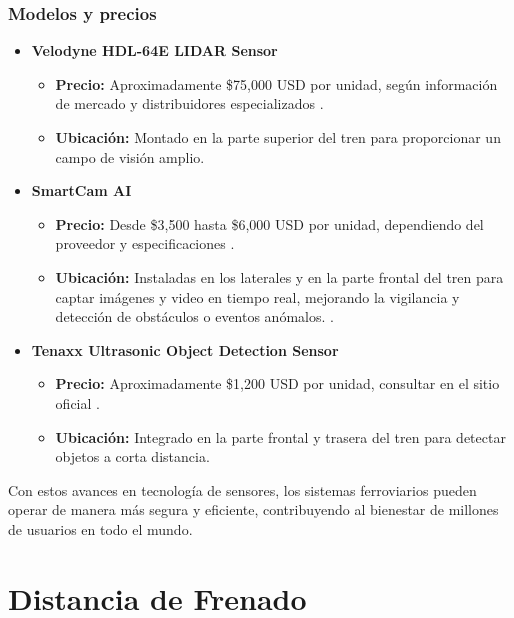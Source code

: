 \documentclass[journal]{IEEEtran}
\begin{document}
\subsubsection{Modelos y precios}  

\begin{itemize}  
    \item \textbf{Velodyne HDL-64E LIDAR Sensor}   
        \begin{itemize}  
            \item \textbf{Precio:} Aproximadamente \$75,000 USD por unidad, según información de mercado y distribuidores especializados \cite{lidar2023}.  
            \item \textbf{Ubicación:} Montado en la parte superior del tren para proporcionar un campo de visión amplio.  
        \end{itemize} 
    \item \textbf{SmartCam AI}  
        \begin{itemize}  
            \item \textbf{Precio:} Desde \$3,500 hasta \$6,000 USD por unidad, dependiendo del proveedor y especificaciones \cite{avigilon2023}.  
            \item \textbf{Ubicación:} Instaladas en los laterales y en la parte frontal del tren para captar imágenes y video en tiempo real, mejorando la vigilancia y detección de obstáculos o eventos anómalos. \cite{moxa2024}. 
        \end{itemize} 
    \item \textbf{Tenaxx Ultrasonic Object Detection Sensor}  
        \begin{itemize}  
            \item \textbf{Precio:} Aproximadamente \$1,200 USD por unidad, consultar en el sitio oficial \cite{tenaxx2024}.  
            \item \textbf{Ubicación:} Integrado en la parte frontal y trasera del tren para detectar objetos a corta distancia.  
        \end{itemize}  
\end{itemize}  

Con estos avances en tecnología de sensores, los sistemas ferroviarios pueden operar de manera más segura y eficiente, contribuyendo al bienestar de millones de usuarios en todo el mundo.  

\section{Distancia de Frenado}
\end{document}

